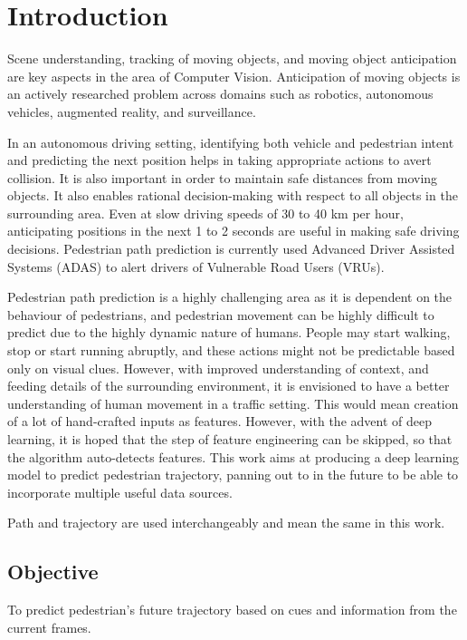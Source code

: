 \chapter{Introduction}

Scene understanding, tracking of moving objects, and moving object anticipation are key aspects in the area of Computer Vision. Anticipation of moving objects is an actively researched problem across domains such as robotics, autonomous vehicles, augmented reality, and surveillance.

In an autonomous driving setting, identifying both vehicle and pedestrian intent and predicting the next position helps in taking appropriate actions to avert collision. It is also important in order to maintain safe distances from moving objects. It also enables rational decision-making with respect to all objects in the surrounding area. Even at slow driving speeds of 30 to 40 km per hour, anticipating positions in the next 1 to 2 seconds are useful in making safe driving decisions. Pedestrian path prediction is currently used Advanced Driver Assisted Systems (ADAS) to alert drivers of Vulnerable Road Users (VRUs).

Pedestrian path prediction is a highly challenging area as it is dependent on the behaviour of pedestrians, and pedestrian movement can be highly difficult to predict due to the highly dynamic nature of humans. People may start walking, stop or start running abruptly, and these actions might not be predictable based only on visual clues. 
However, with  improved understanding of context, and feeding details of the surrounding environment, it is envisioned to have a better understanding of human movement in a traffic setting. This would mean creation of a lot of hand-crafted inputs as features. However, with the advent of deep learning, it is hoped that the step of feature engineering can be skipped, so that the algorithm auto-detects features. This work aims at producing a deep learning model to predict pedestrian trajectory, panning out to in the future to be able to incorporate multiple useful data sources. 

Path and trajectory are used interchangeably and mean the same in this work.

\section{Objective}

To predict pedestrian's future trajectory based on cues and information from the current frames. 


